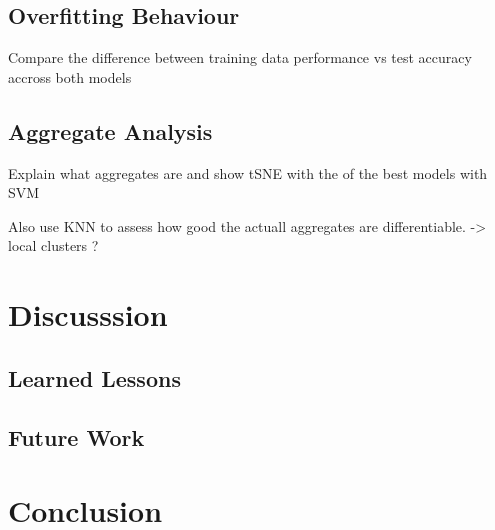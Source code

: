 \subsection{Overfitting Behaviour}
Compare the difference between training data performance vs test accuracy accross both models

\subsection{Aggregate Analysis}
Explain what aggregates are and show tSNE with the of the best models with SVM

Also use KNN to assess how good the actuall aggregates are differentiable. -> local clusters ?

\section{Discusssion}
\subsection{Learned Lessons}
\subsection{Future Work}

\section{Conclusion}